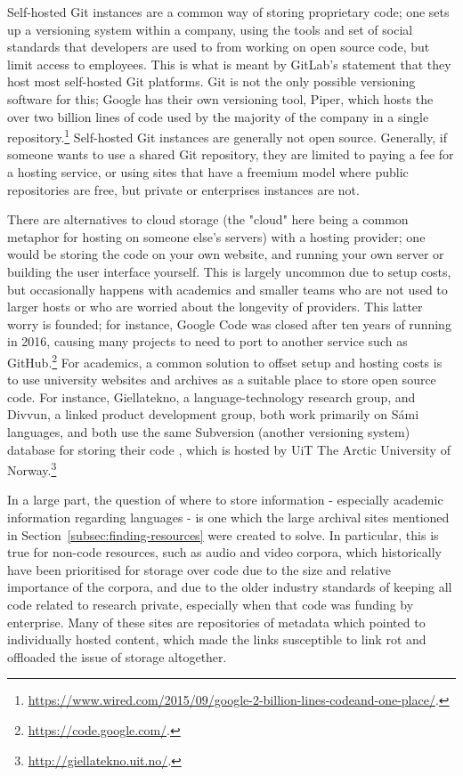 Self-hosted Git instances are a common way of storing proprietary code; one sets up a versioning system within a company, using the tools and set of social standards that developers are used to from working on open source code, but limit access to employees. This is what is meant by GitLab's statement that they host most self-hosted Git platforms. Git is not the only possible versioning software for this; Google has their own versioning tool, Piper, which hosts the over two billion lines of code used by the majority of the company in a single repository.\footnote{\href{https://www.wired.com/2015/09/google-2-billion-lines-codeand-one-place/}{https://www.wired.com/2015/09/google-2-billion-lines-codeand-one-place/}. } Self-hosted Git instances are generally not open source. Generally, if someone wants to use a shared Git repository, they are limited to paying a fee for a hosting service, or using sites that have a freemium model where public repositories are free, but private or enterprises instances are not.

There are alternatives to cloud storage (the "cloud" here being a common metaphor for hosting on someone else's servers) with a hosting provider; one would be storing the code on your own website, and running your own server or building the user interface yourself. This is largely uncommon due to setup costs, but occasionally happens with academics and smaller teams who are not used to larger hosts or who are worried about the longevity of providers. This latter worry is founded; for instance, Google Code was closed after ten years of running in 2016, causing many projects to need to port to another service such as GitHub.\footnote{\href{https://code.google.com/}{https://code.google.com/}. } For academics, a common solution to offset setup and hosting costs is to use university websites and archives as a suitable place to store open source code. For instance, Giellatekno, a language-technology research group, and Divvun, a linked product development group, both work primarily on S\'ami languages, and both use the same Subversion (another versioning system) database for storing their code \citep{moshagenopen}, which is hosted by UiT The Arctic University of Norway.\footnote{\href{http://giellatekno.uit.no/}{http://giellatekno.uit.no/}. }

In a large part, the question of where to store information - especially academic information regarding languages - is one which the large archival sites mentioned in Section~\ref{subsec:finding-resources} were created to solve. In particular, this is true for non-code resources, such as audio and video corpora, which historically have been prioritised for storage over code due to the size and relative importance of the corpora, and due to the older industry standards of keeping all code related to research private, especially when that code was funding by enterprise. Many of these sites are repositories of metadata which pointed to individually hosted content, which made the links susceptible to link rot and offloaded the issue of storage altogether.

